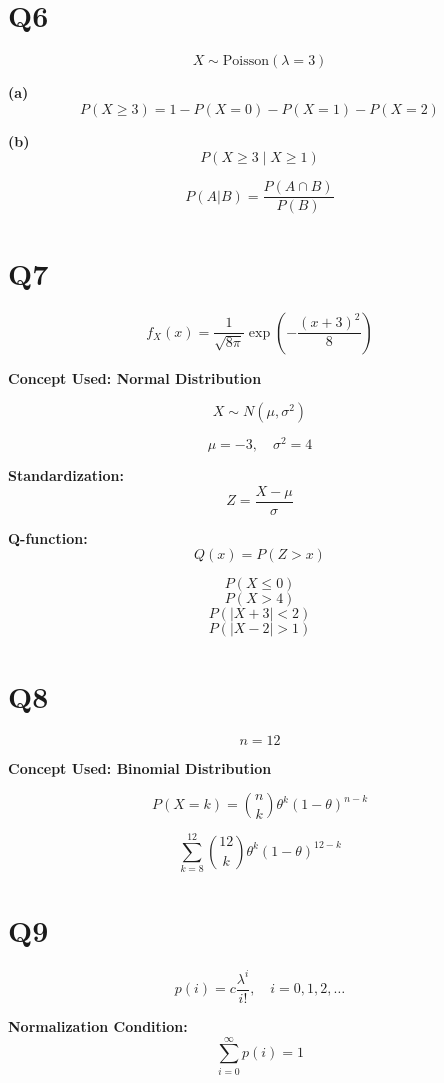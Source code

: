 \documentclass[12pt]{article}
\begin{document}
\section*{Q6}

\[
X \sim \text{Poisson}(\lambda = 3)
\]

\textbf{(a)}
\[
P(X \ge 3) = 1 - P(X=0) - P(X=1) - P(X=2)
\]

\textbf{(b)}
\[
P(X \ge 3 \mid X \ge 1)
\]

\[
P(A|B) = \frac{P(A \cap B)}{P(B)}
\]

\section*{Q7}

\[
f_X(x) = \frac{1}{\sqrt{8\pi}} \exp\left(-\frac{(x+3)^2}{8}\right)
\]

\textbf{Concept Used: Normal Distribution}

\[
X \sim N(\mu, \sigma^2)
\]

\[
\mu = -3, \quad \sigma^2 = 4
\]

\textbf{Standardization:}
\[
Z = \frac{X-\mu}{\sigma}
\]

\textbf{Q-function:}
\[
Q(x) = P(Z > x)
\]

\[
P(X \le 0)
\]
\[
P(X > 4)
\]
\[
P(|X+3| < 2)
\]
\[
P(|X-2| > 1)
\]

\newpage
\section*{Q8}

\[
n = 12
\]

\textbf{Concept Used: Binomial Distribution}

\[
P(X=k) = \binom{n}{k} \theta^k (1-\theta)^{n-k}
\]

\[
\sum_{k=8}^{12} \binom{12}{k} \theta^k (1-\theta)^{12-k}
\]

\section*{Q9}

\[
p(i) = c \frac{\lambda^i}{i!}, \quad i=0,1,2,\dots
\]

\textbf{Normalization Condition:}
\[
\sum_{i=0}^{\infty} p(i) = 1
\]
\end{document}
